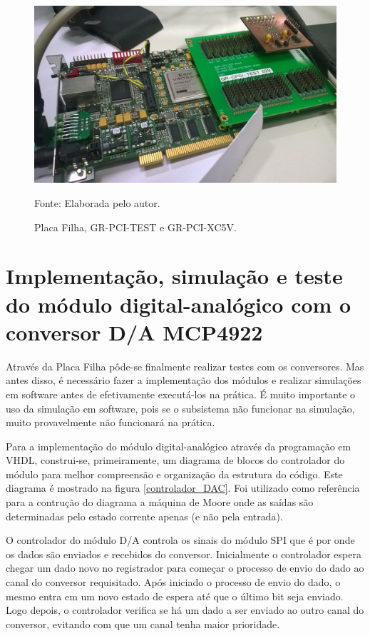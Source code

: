 \begin{figure}[H]
	\centering
	\caption{Placa Filha, GR-PCI-TEST e GR-PCI-XC5V.}
	\includegraphics[scale = .8, angle = 90]{Imagens/PlacaFilha_GRPCI}
	
	Fonte: Elaborada pelo autor.
	
	\label{PlacaFilha_GRPCI}
\end{figure}


\section{Implementação, simulação e teste do módulo digital-analógico com o conversor D/A MCP4922}

Através da Placa Filha pôde-se finalmente realizar testes com os conversores. Mas antes disso, é necessário fazer a implementação dos módulos e realizar simulações em software antes de efetivamente executá-los na prática. É muito importante o uso da simulação em software, pois se o subsistema não funcionar na simulação, muito provavelmente não funcionará na prática.

Para a implementação do módulo digital-analógico através da programação em VHDL, construi-se, primeiramente, um diagrama de blocos do controlador do módulo para melhor compreensão e organização da estrutura do código. Este diagrama é mostrado na figura \ref{controlador_DAC}. Foi utilizado como referência para a contrução do diagrama a máquina de Moore onde as saídas são determinadas pelo estado corrente apenas (e não pela entrada). 

O controlador do módulo D/A controla os sinais do módulo SPI que é por onde os dados são enviados e recebidos do conversor. Inicialmente o controlador espera chegar um dado novo no registrador para começar o processo de envio do dado ao canal do conversor requisitado. Após iniciado o processo de envio do dado, o mesmo entra em um novo estado de espera até que o último bit seja enviado. Logo depois, o controlador verifica se há um dado a ser enviado ao outro canal do conversor, evitando com que um canal tenha maior prioridade.

